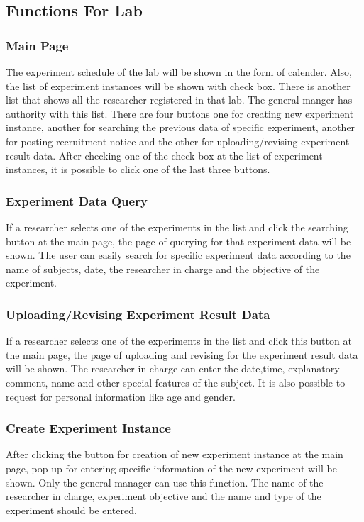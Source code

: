 \documentclass[letterpaper, 10 pt, conference]{ieeeconf}  %
\begin{document}
\subsection{Functions For Lab}

\subsubsection{Main Page}
The experiment schedule of the lab will be shown in the form of calender.  Also, the list of experiment instances will be shown with check box. There is another list that shows all the researcher registered in that lab. The general manger has authority with this list. There are four buttons one for creating new experiment instance, another for searching the previous data of specific experiment, another for posting recruitment notice and the other for uploading/revising experiment result data. 
After checking one of the check box at the list of experiment instances, it is possible to click one of the last three buttons. 
\subsubsection{Experiment Data Query}
If a researcher selects one of the experiments in the list and click the searching button at the main page, the page of querying for that experiment data will be shown. The user can easily search for specific experiment data according to the name of subjects, date, the researcher in charge and the objective of the experiment. 
\subsubsection{Uploading/Revising Experiment Result Data}
If a researcher selects one of the experiments in the list and click this button at the main page, the page of uploading and revising for the experiment result data will be shown. The researcher in charge can enter the date,time, explanatory comment, name and other special features of the subject. It is also possible to request for personal information like age and gender. 
\subsubsection{Create Experiment Instance}
After clicking the button for creation of new experiment instance at the main page, pop-up for entering specific information of the new experiment will be shown. Only the general manager can use this function. The name of the researcher in charge, experiment objective and the name and type of the experiment should be entered. 
\end{document}
